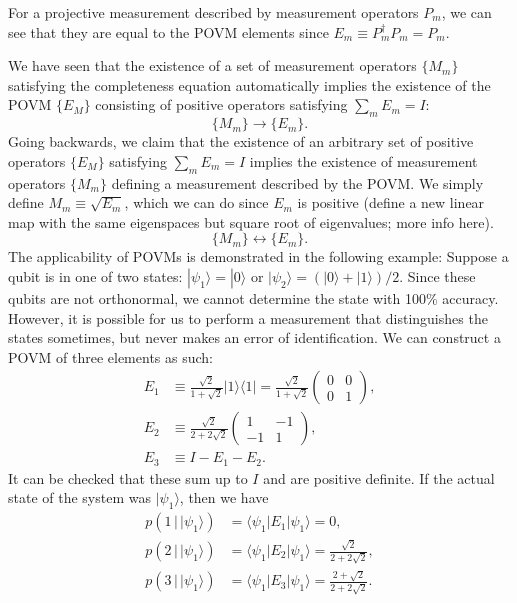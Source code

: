 \documentclass{article}
\theoremstyle{definition}
\begin{document}
For a projective measurement described by measurement operators $P_m$, we can see that they are equal to the POVM elements since $E_m \equiv P_m^\dagger P_m = P_m$.

We have seen that the existence of a set of measurement operators $\{M_m\}$ satisfying the completeness equation automatically implies the existence of the POVM $\{E_M\}$ consisting of positive operators satisfying $\sum_m E_m = I$:
\[\{M_m\} \longrightarrow \{E_m\}.\]
Going backwards, we claim that the existence of an arbitrary set of positive operators $\{E_M\}$ satisfying $\sum_m E_m = I$ implies the existence of measurement operators $\{M_m\}$ defining a measurement described by the POVM. We simply define $M_m \equiv \sqrt{E_m}$, which we can do since $E_m$ is positive (define a new linear map with the same eigenspaces but square root of eigenvalues; more info here).
\[\{M_m\} \longleftrightarrow \{E_m\}.\]
The applicability of POVMs is demonstrated in the following example: Suppose a qubit is in one of two states: $|\psi_1 \rangle = |0 \rangle$ or $|\psi_2 \rangle = (|0 \rangle + |1 \rangle)/2$. Since these qubits are not orthonormal, we cannot determine the state with 100\% accuracy. However, it is possible for us to perform a measurement that distinguishes the states sometimes, but never makes an error of identification. We can construct a POVM of three elements as such:
\begin{align*}
    E_1 & \equiv \frac{\sqrt{2}}{1 + \sqrt{2}} |1\rangle \langle 1| = \frac{\sqrt{2}}{1 + \sqrt{2}} \begin{pmatrix} 0&0\\0&1 \end{pmatrix}, \\
    E_2 & \equiv \frac{\sqrt{2}}{2 + 2 \sqrt{2}} \begin{pmatrix} 1 & -1 \\ -1 & 1 \end{pmatrix}, \\
    E_3 & \equiv I - E_1 - E_2.
\end{align*}
It can be checked that these sum up to $I$ and are positive definite. If the actual state of the system was $|\psi_1 \rangle$, then we have
\begin{align*}
    p(1 \,|\, |\psi_1 \rangle) & = \langle \psi_1 | E_1 | \psi_1 \rangle = 0, \\
    p(2 \,|\, |\psi_1 \rangle) & = \langle \psi_1 | E_2 | \psi_1 \rangle = \frac{\sqrt{2}}{2 + 2\sqrt{2}}, \\
    p(3 \,|\, |\psi_1 \rangle) & = \langle \psi_1 | E_3 | \psi_1 \rangle =  \frac{2 + \sqrt{2}}{2 + 2\sqrt{2}}.
\end{align*}
\end{document}
